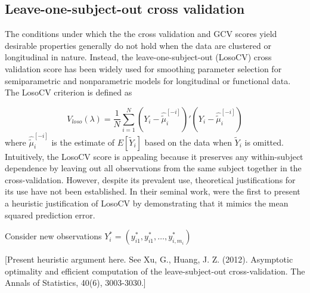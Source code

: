 \documentclass[12pt]{article}
\newcommand{\tildeY}{\tilde{Y}}
\theoremstyle{definition}
\begin{document}
\subsection{Leave-one-subject-out cross validation}  
The conditions under which the the cross validation and GCV scores yield desirable properties generally do not hold when the data are clustered or longitudinal in nature. Instead, the leave-one-subject-out (LosoCV) cross validation score has been widely used for smoothing parameter selection for semiparametric and nonparametric models for longitudinal or functional data. The LosoCV criterion is defined as

\begin{equation} \label{eq:LOSOCV}
V_{loso}\left(\lambda\right) = \frac{1}{N}\sum_{i=1}^N \left( Y_i - \widehat{\tilde{\mu}}^{\left[-i\right]}_{i}\right)'\left( Y_i -  \widehat{\tilde{\mu}}^{\left[-i\right]}_{i}\right)
\end{equation}
\noindent
where $\widehat{\tilde{\mu}}^{\left[-i\right]}_{i}$ is the estimate of $E\left[ \tildeY_i \right]$ based on the data when $\tildeY_i$ is omitted. Intuitively, the LosoCV score is appealing because it preserves any within-subject dependence by leaving out all observations from the same subject together in the cross-validation.  However, despite its prevalent use, theoretical justifications for its use have not been established. In their seminal work, \citet{rice1991estimating} were the first to present a heuristic justification of LosoCV by demonstrating that it mimics the mean squared prediction error.
\bigskip

Consider new observations $Y^*_i = \left(y_{i1}^*, y_{i1}^*, \dots, y_{i, m_i}^*\right)$  
\bigskip 

[Present heuristic argument here. See Xu, G.,  Huang, J. Z. (2012). Asymptotic optimality and efficient computation of the leave-subject-out cross-validation. The Annals of Statistics, 40(6), 3003-3030.] 
\end{document}
